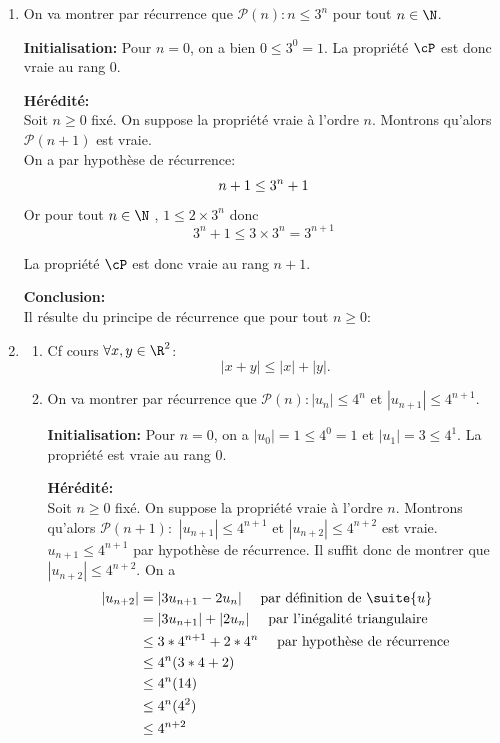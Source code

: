 \begin{correction}
\begin{enumerate}
\item  On  va montrer par récurrence que $\mathcal{P}(n) : n\leq 3^n$ pour tout $n\in \N$. 



\textbf{Initialisation:}  Pour $n=0$, on a bien $0\leq 3^0=1$. La propriété $\cP$ est donc vraie au rang $0$. 

 \textbf{H\'er\'edit\'e:}\\
Soit $n\geq 0$ fix\'e. On suppose la propri\'et\'e vraie \`a l'ordre $n$. Montrons qu'alors $\mathcal{P}(n+1)$ est vraie.\\

On a par hypothèse de récurrence: 
\begin{equation*}
n+1\leq 3^n +1 \\
\end{equation*}
Or  pour tout $n\in \N$ , $1 \leq 2\times 3^n$ donc 
$$3^n+1 \leq 3 \times 3^n =3^{n+1}$$

La propriété $\cP$ est donc vraie au rang $n+1$.

\textbf{Conclusion:}\\
Il r\'esulte du principe de r\'ecurrence que pour tout $ n\geq 0$:
\begin{center}
\end{center}

\item \begin{enumerate}
\item Cf cours $\forall x, y \in \R^2$:
$$|x+y|\leq |x|+|y|.$$
\item On  va montrer par récurrence que $\mathcal{P}(n) : |u_n| \leq 4^n$  et $|u_{n+1}| \leq 4^{n+1}$. 



\textbf{Initialisation:}  Pour $n=0$, on a $|u_0| = 1\leq 4^0=1$ et $|u_1|=3 \leq 4^1$. 
La propriété est vraie au rang $0$. 
 
 \textbf{H\'er\'edit\'e:}\\
Soit $n\geq 0$ fix\'e. On suppose la propri\'et\'e vraie \`a l'ordre $n$. Montrons qu'alors $\mathcal{P}(n+1)  :$ \og  $|u_{n+1}| \leq 4^{n+1}$  et $|u_{n+2}| \leq 4^{n+2}$ \fg{}  est vraie.\\

$u_{n+1}\leq 4^{n+1}$ par hypothèse de récurrence. Il suffit donc de montrer que $|u_{n+2}| \leq 4^{n+2}$. On a 
\begin{align*}
|u_{n+2}|&= |3u_{n+1} -2u_n| \quad \text{ par définition de $\suite{u}$}\\
				&= |3u_{n+1}|+|2u_n| \quad \text{ par l'inégalité triangulaire}\\
								&\leq  3*4^{n+1}+2*4^n \quad \text{ par hypothèse de récurrence}\\
								&\leq  4^{n}(3*4+2) \\
								&\leq  4^{n}(14) \\
								&\leq  4^{n}(4^2) \\								
								&\leq  4^{n+2} \\																
\end{align*}


\end{enumerate}
\end{enumerate}
\end{correction}
